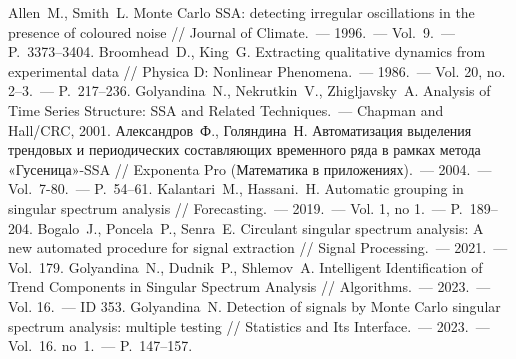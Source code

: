 \documentclass{math-mech-sci}
\begin{document}
\begin{thebibliography}{8}
     Allen~M., Smith~L. Monte Carlo SSA: detecting irregular oscillations in the presence of coloured noise // Journal of Climate.~--- 1996.~--- Vol.~9.~--- P.~3373--3404.
     Broomhead~D., King~G. Extracting qualitative dynamics from experimental data // Physica D: Nonlinear Phenomena.~--- 1986.~--- Vol. 20, no. 2–3.~--- P.~217--236.
     Golyandina~N., Nekrutkin~V., Zhigljavsky~A. Analysis of Time Series Structure: SSA and Related Techniques.~--- Chapman and Hall/CRC, 2001.
     Александров~Ф., Голяндина~Н.
    Автоматизация выделения трендовых и периодических составляющих временного ряда в рамках метода «Гусеница»-SSA // Exponenta Pro (Математика в приложениях).~--- 2004.~--- Vol.~7-80.~--- P.~54--61.
     Kalantari~M., Hassani.~H. Automatic grouping in singular spectrum analysis // Forecasting.~--- 2019.~--- Vol. 1, no 1.~--- P.~189--204.
     Bogalo~J., Poncela~P., Senra~E. Circulant singular spectrum analysis: A new automated procedure for signal extraction // Signal Processing.~--- 2021.~--- Vol.~179.
     Golyandina~N., Dudnik~P., Shlemov~A. Intelligent Identification of Trend Components in Singular Spectrum Analysis // Algorithms.~--- 2023.~--- Vol. 16.~--- ID 353.
     Golyandina~N. Detection of signals by Monte Carlo singular spectrum analysis: multiple testing // Statistics and Its Interface.~--- 2023.~--- Vol.~16. no~1.~--- P.~147--157.
\end{thebibliography}
\end{document}
